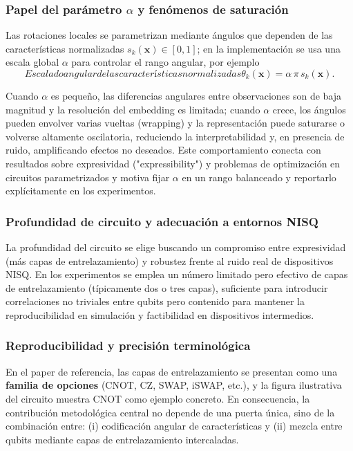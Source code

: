 \subsubsection{Papel del parámetro \texorpdfstring{$\alpha$}{alpha} y fenómenos de saturación}

Las rotaciones locales se parametrizan mediante ángulos que dependen de las características normalizadas $s_k(\mathbf{x})\in[0,1]$; en la implementación se usa una escala global $\alpha$ para controlar el rango angular, por ejemplo
\begin{equation}[eq:escala_angular_alpha]{Escalado angular de las características normalizadas}
\theta_k(\mathbf{x}) = \alpha\,\pi\, s_k(\mathbf{x}).
\end{equation}

Cuando $\alpha$ es pequeño, las diferencias angulares entre observaciones son de baja magnitud y la resolución del embedding es limitada; cuando $\alpha$ crece, los ángulos pueden envolver varias vueltas (wrapping) y la representación puede saturarse o volverse altamente oscilatoria, reduciendo la interpretabilidad y, en presencia de ruido, amplificando efectos no deseados. Este comportamiento conecta con resultados sobre expresividad ("expressibility") y problemas de optimización en circuitos parametrizados y motiva fijar $\alpha$ en un rango balanceado y reportarlo explícitamente en los experimentos.

\subsubsection{Profundidad de circuito y adecuación a entornos NISQ}

La profundidad del circuito se elige buscando un compromiso entre expresividad (más capas de entrelazamiento) y robustez frente al ruido real de dispositivos NISQ. En los experimentos se emplea un número limitado pero efectivo de capas de entrelazamiento (típicamente dos o tres capas), suficiente para introducir correlaciones no triviales entre qubits pero contenido para mantener la reproducibilidad en simulación y factibilidad en dispositivos intermedios.

\subsubsection{Reproducibilidad y precisión terminológica}

En el paper de referencia, las capas de entrelazamiento se presentan como una \textbf{familia de opciones} (CNOT, CZ, SWAP, iSWAP, etc.), y la figura ilustrativa del circuito muestra CNOT como ejemplo concreto. En consecuencia, la contribución metodológica central no depende de una puerta única, sino de la combinación entre: (i) codificación angular de características y (ii) mezcla entre qubits mediante capas de entrelazamiento intercaladas.

